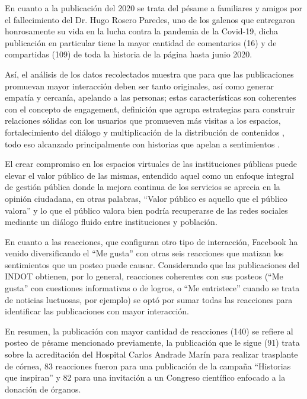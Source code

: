 \documentclass[spanish]{textolivre}
\begin{document}
En cuanto a la publicación del 2020 se trata del pésame a familiares y amigos por el fallecimiento del Dr. Hugo Rosero Paredes, uno de los galenos que entregaron honrosamente su vida en la lucha contra la pandemia de la Covid-19, dicha publicación en particular tiene la mayor cantidad de comentarios (16) y de compartidas (109) de toda la historia de la página hasta junio 2020.

Así, el análisis de los datos recolectados muestra que para que las publicaciones promuevan mayor interacción deben ser tanto originales, así como generar empatía y cercanía, apelando a las personas; estas características son coherentes con el concepto de engagement, definición que agrupa estrategias para construir relaciones sólidas con los usuarios que promueven más visitas a los espacios, fortalecimiento del diálogo y multiplicación de la distribución de contenidos \cite{diccionario2015}, todo eso alcanzado principalmente con historias que apelan a sentimientos \cite{miller2017}.

El crear compromiso en los espacios virtuales de las instituciones públicas puede elevar el valor público de las mismas, entendido aquel como un enfoque integral de gestión pública donde la mejora continua de los servicios se aprecia en la opinión ciudadana, en otras palabras, “Valor público es aquello que el público valora” \cite{conejero2014} y lo que el público valora bien podría recuperarse de las redes sociales mediante un diálogo fluido entre instituciones y población.

En cuanto a las reacciones, que configuran otro tipo de interacción, Facebook ha venido diversificando el “Me gusta” con otras seis reacciones que matizan los sentimientos que un posteo puede causar. Considerando que las publicaciones del INDOT obtienen, por lo general, reacciones coherentes con sus posteos (“Me gusta” con cuestiones informativas o de logros, o “Me entristece” cuando se trata de noticias luctuosas, por ejemplo) se optó por sumar todas las reacciones para identificar las publicaciones con mayor interacción.

En resumen, la publicación con mayor cantidad de reacciones (140) se refiere al posteo de pésame mencionado previamente, la publicación que le sigue (91) trata sobre la acreditación del Hospital Carlos Andrade Marín para realizar trasplante de córnea, 83 reacciones fueron para una publicación de la campaña “Historias que inspiran” y 82 para una invitación a un Congreso científico enfocado a la donación de órganos. 
\end{document}
